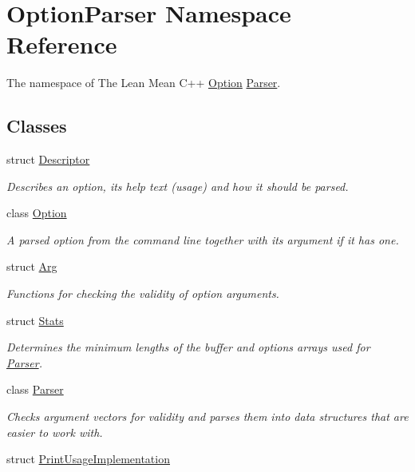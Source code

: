 \hypertarget{namespace_option_parser}{\section{Option\-Parser Namespace Reference}
\label{namespace_option_parser}
}


The namespace of The Lean Mean C++ \hyperlink{class_option_parser_1_1_option}{Option} \hyperlink{class_option_parser_1_1_parser}{Parser}.  


\subsection*{Classes}
\begin{DoxyCompactItemize}
\item 
struct \hyperlink{struct_option_parser_1_1_descriptor}{Descriptor}
\begin{DoxyCompactList}\small\item\em Describes an option, its help text (usage) and how it should be parsed. \end{DoxyCompactList}\item 
class \hyperlink{class_option_parser_1_1_option}{Option}
\begin{DoxyCompactList}\small\item\em A parsed option from the command line together with its argument if it has one. \end{DoxyCompactList}\item 
struct \hyperlink{struct_option_parser_1_1_arg}{Arg}
\begin{DoxyCompactList}\small\item\em Functions for checking the validity of option arguments. \end{DoxyCompactList}\item 
struct \hyperlink{struct_option_parser_1_1_stats}{Stats}
\begin{DoxyCompactList}\small\item\em Determines the minimum lengths of the buffer and options arrays used for \hyperlink{class_option_parser_1_1_parser}{Parser}. \end{DoxyCompactList}\item 
class \hyperlink{class_option_parser_1_1_parser}{Parser}
\begin{DoxyCompactList}\small\item\em Checks argument vectors for validity and parses them into data structures that are easier to work with. \end{DoxyCompactList}\item 
struct \hyperlink{struct_option_parser_1_1_print_usage_implementation}{Print\-Usage\-Implementation}
\end{DoxyCompactItemize}
